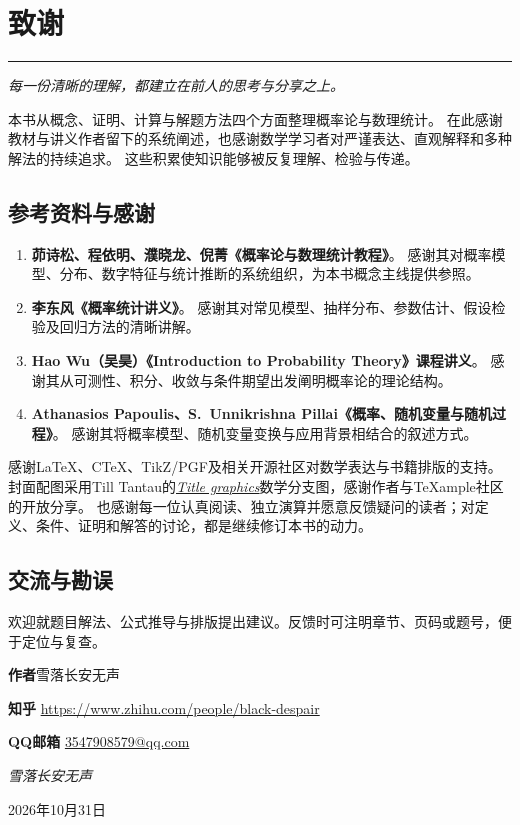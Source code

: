 \chapter{致谢}\label{front:acknowledgements}
\begingroup\small\setlength{\parskip}{2pt}
\begin{center}
  {\color{Teal}\rule{.22\textwidth}{.6pt}}\par
  \vspace{3mm}
  {\itshape 每一份清晰的理解，都建立在前人的思考与分享之上。}
\end{center}
\vspace{3mm}

本书从概念、证明、计算与解题方法四个方面整理概率论与数理统计。
在此感谢教材与讲义作者留下的系统阐述，也感谢数学学习者对严谨表达、直观解释和多种解法的持续追求。
这些积累使知识能够被反复理解、检验与传递。

\section*{参考资料与感谢}
\begin{enumerate}[label=\arabic*.,leftmargin=1.8em,itemsep=4pt]
\item \textbf{茆诗松、程依明、濮晓龙、倪菁《概率论与数理统计教程》}。
感谢其对概率模型、分布、数字特征与统计推断的系统组织，为本书概念主线提供参照。
\item \textbf{李东风《概率统计讲义》}。
感谢其对常见模型、抽样分布、参数估计、假设检验及回归方法的清晰讲解。
\item \textbf{Hao Wu（吴昊）《Introduction to Probability Theory》课程讲义}。
感谢其从可测性、积分、收敛与条件期望出发阐明概率论的理论结构。
\item \textbf{Athanasios Papoulis、S.~Unnikrishna Pillai《概率、随机变量与随机过程》}。
感谢其将概率模型、随机变量变换与应用背景相结合的叙述方式。
\end{enumerate}

感谢\LaTeX、CTeX、TikZ/PGF及相关开源社区对数学表达与书籍排版的支持。
封面配图采用Till Tantau的\href{https://texample.net/title-graphics/}{\textit{Title graphics}}数学分支图，感谢作者与TeXample社区的开放分享。
也感谢每一位认真阅读、独立演算并愿意反馈疑问的读者；对定义、条件、证明和解答的讨论，都是继续修订本书的动力。

\section*{交流与勘误}
欢迎就题目解法、公式推导与排版提出建议。反馈时可注明章节、页码或题号，便于定位与复查。
\begin{tcolorbox}[colframe=Teal!65,colback=Teal!3,boxrule=.45pt,title={联系方式}]
\textbf{作者}\quad 雪落长安无声\par\smallskip
\textbf{知乎}\quad
\href{https://www.zhihu.com/people/black-despair}{https://www.zhihu.com/people/black-despair}\par\smallskip
\textbf{QQ邮箱}\quad
\href{mailto:3547908579@qq.com}{3547908579@qq.com}
\end{tcolorbox}
\vfill
\begin{flushright}\itshape 雪落长安无声\par 2026年10月31日\end{flushright}
\endgroup
